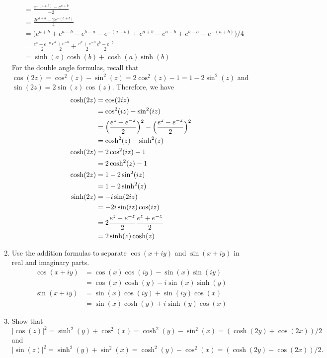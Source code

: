 \begin{enumerate}
\begin{align*}
                 & = \frac{e^{-(a + b)} - e^{a + b}}{-2}\\
                 & = \frac{2e^{a + b} - 2e^{-(a + b)}}{4}\\
                 & = \bigl(e^{a + b} + e^{a - b} - e^{b - a} - e ^{-(a + b)} +
                   e^{a + b} - e^{a - b} + e^{b - a} - e^{-(a + b)}\bigr)/4\\
                 & = \frac{e^a - e^{-a}}{2}\frac{e^b + e^{-b}}{2} +
                   \frac{e^a + e^{-a}}{2}\frac{e^b - e^{-b}}{2}\\
                 & = \sinh(a)\cosh(b) + \cosh(a)\sinh(b)
  \end{align*}
  For the double angle formulas, recall that
  \(\cos(2z) = \cos^2(z) - \sin^2(z) = 2\cos^2(z) - 1 = 1 - 2\sin^2(z)\) and
  \(\sin(2z) = 2\sin(z)\cos(z)\).
  Therefore, we have
  \begin{align*}
    \cosh(2z) & = \cos(2iz)\\
              & = \cos^2(iz) - \sin^2(iz)\\
              & = \Bigl(\frac{e^z + e^{-z}}{2}\Bigr)^2 -
                \Bigl(\frac{e^z - e^{-z}}{2}\Bigr)^2\\
              & = \cosh^2(z) - \sinh^2(z)\\
    \cosh(2z) & = 2\cos^2(iz) - 1\\
              & = 2\cosh^2(z) - 1\\
    \cosh(2z) & = 1 - 2\sin^2(iz)\\
              & = 1 - 2\sinh^2(z)\\
    \sinh(2z) & = -i\sin(2iz)\\
              & = -2i\sin(iz)\cos(iz)\\
              & = 2\frac{e^z - e^{-z}}{2}\frac{e^z + e^{-z}}{2}\\
              & = 2\sinh(z)\cosh(z)
  \end{align*}
\item
  Use the addition formulas to separate \(\cos(x + iy)\) and \(\sin(x + iy)\)
  in real and imaginary parts.
  \begin{align*}
    \cos(x + iy) & = \cos(x)\cos(iy) - \sin(x)\sin(iy)\\
                 & = \cos(x)\cosh(y) - i\sin(x)\sinh(y)\\
    \sin(x + iy) & = \sin(x)\cos(iy) + \sin(iy)\cos(x)\\
                 & = \sin(x)\cosh(y) + i\sinh(y)\cos(x)
  \end{align*}
\item
  Show that
  \[
  \lvert\cos(z)\rvert^2 = \sinh^2(y) + \cos^2(x) = \cosh^2(y) - \sin^2(x) =
  (\cosh(2y) + \cos(2x))/2
  \]
  and
  \[
  \lvert\sin(z)\rvert^2 = \sinh^2(y) + \sin^2(x) = \cosh^2(y) - \cos^2(x) =
  (\cosh(2y) - \cos(2x))/2.
  \]
\end{enumerate}

